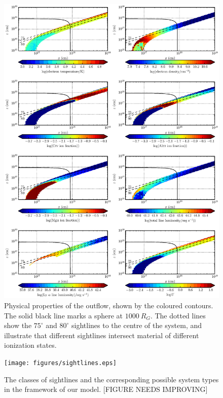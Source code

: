 \documentclass[useAMS,usenatbib]{mn2e_x}
\begin{document}
\begin{figure} %
\centering
\includegraphics[width=1.0\textwidth]{figures/wind.eps}
\caption
{
Physical properties of the outflow, shown by the coloured contours.
The solid black line marks a sphere at $1000~R_G$.
The dotted lines show the $75^\circ$ and $80^\circ$ sightlines 
to the centre of the system, and illustrate that different sightlines
intersect material of different ionization states.
}
\label{fig:uvspec}
\end{figure} %

\begin{figure}
\centering
\texttt{[image: figures/sightlines.eps]}
\caption
{
The classes of sightlines and the corresponding possible 
system types in the framework of our model.
[FIGURE NEEDS IMPROVING]
}
\label{fig:lobal}
\end{figure}
\end{document}
